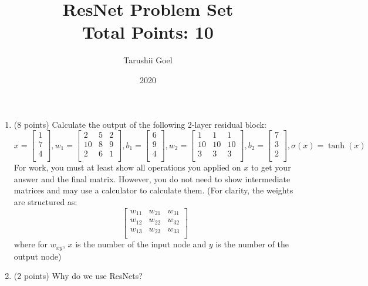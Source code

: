 \documentclass{article}
\title{ResNet Problem Set \\ Total Points: 10}
\author{Tarushii Goel}
\date{2020}
\begin{document}
\begin{center}
\end{center}
 
\vspace{5mm}
 
 
\vspace{5mm}

\begin{enumerate}
	\item (8 points) Calculate the output of the following 2-layer residual block: 
	\begin{equation}
	x = \begin{bmatrix}
		1 \\
		7 \\
		4 \\
		\end{bmatrix},
	w_1 = \begin{bmatrix}
		2 & 5 & 2\\
		10 & 8 & 9\\
		2 & 6 & 1\\
		\end{bmatrix},
	b_1 = \begin{bmatrix}
		6 \\
		9 \\
		4 \\
		\end{bmatrix},
	w_2 = \begin{bmatrix}
		1 & 1 & 1\\
		10 & 10 & 10\\
		3 & 3 & 3\\
		\end{bmatrix},
	b_2= \begin{bmatrix}
		7 \\
		3 \\
		2 \\
		\end{bmatrix},
	\sigma(x) = \tanh(x)
	\end{equation}
	For work, you must at least show all operations you applied on $x$ to get your answer and the final matrix. However, you do not need to show intermediate matrices and may use a calculator to calculate them. 
	(For clarity, the weights are structured as: 
		$$ \begin{bmatrix}
		w_{11} & w_{21} & w_{31}\\
		w_{12} & w_{22} & w_{32}\\
		w_{13} & w_{23} & w_{33}\\
		\end{bmatrix} $$
		where for $w_{xy}$, $x$ is the number of the input node and $y$ is the number of the output node)
	\pagebreak 
	\item (2 points) Why do we use ResNets? 

\end {enumerate}
\end{document}
